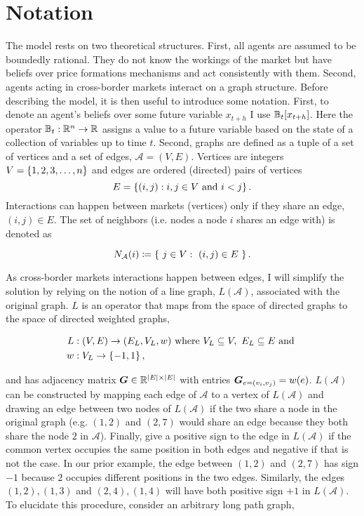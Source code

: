 \section{Notation}
The model rests on two theoretical structures. First, all agents are assumed to be boundedly rational. They do not know the workings of the market but have beliefs over price formations mechanisms and act consistently with them. Second, agents acting in cross-border markets interact on a graph structure. Before describing the model, it is then useful to introduce some notation. First, to denote an agent's beliefs over some future variable $x_{t+h}$ I use $\mathbb{B}_t[x_{t+h}]$. Here the operator $\mathbb{B}_t: \mathbb{R}^n \to \mathbb{R}$ assigns a value to a future variable based on the state of a collection of variables up to time $t$. Second, graphs are defined as a tuple of a set of vertices and a set of edges, $\mathcal{A} = (V, E)$. Vertices are integers $V = \left\{1, 2, 3, \ldots, n\right\}$ and edges are ordered (directed) pairs of vertices \begin{equation*}E = \left\{(i, j) : i, j \in V \text{ and } i < j\right\}.\end{equation*} Interactions can happen between markets (vertices) only if they share an edge, $(i, j) \in E$. The set of neighbors (i.e. nodes a node $i$ shares an edge with) is denoted as

\begin{equation}
  N_{\mathcal{A}}(i) \coloneqq \left\{ \ j \in V: \ (i, j) \in E \ \right\}.
\end{equation}


As cross-border markets interactions happen between edges, I will simplify the solution by relying on the notion of a line graph, $L(\mathcal{A})$, associated with the original graph. $L$ is an operator that maps from the space of directed graphs to the space of directed weighted graphs,

\begin{equation}
  \begin{split}
    L&: (V, E) \to (E_{L}, V_{L}, w) \text{ where } V_{L}\subseteq V, \ E_{L}\subseteq E \text{ and } \\
    w&: V_{L} \to \left\{-1, 1\right\},
  \end{split}
\end{equation}


and has adjacency matrix $\bm{G} \in \mathbb{R}^{\lvert E\rvert\times \lvert E\rvert}$ with entries $\bm{G}_{e = (v_i, v_j)} = w(e)$. $L(\mathcal{A})$ can be constructed by mapping each edge of $\mathcal{A}$ to a vertex of $L(\mathcal{A})$ and drawing an edge between two nodes of $L(\mathcal{A})$ if the two share a node in the original graph (e.g. $(1, 2)$ and $(2, 7)$ would share an edge because they both share the node $2$ in $\mathcal{A}$). Finally, give a positive sign to the edge in $L(\mathcal{A})$ if the common vertex occupies the same position in both edges and negative if that is not the case. In our prior example, the edge between $(1, 2)$ and $(2, 7)$ has sign $-1$ because $2$ occupies different positions in the two edges. Similarly, the edges $(1, 2), (1, 3)$ and $(2, 4), (1, 4)$ will have both positive sign $+1$ in $L(\mathcal{A})$. To elucidate this procedure, consider an arbitrary long path graph,

